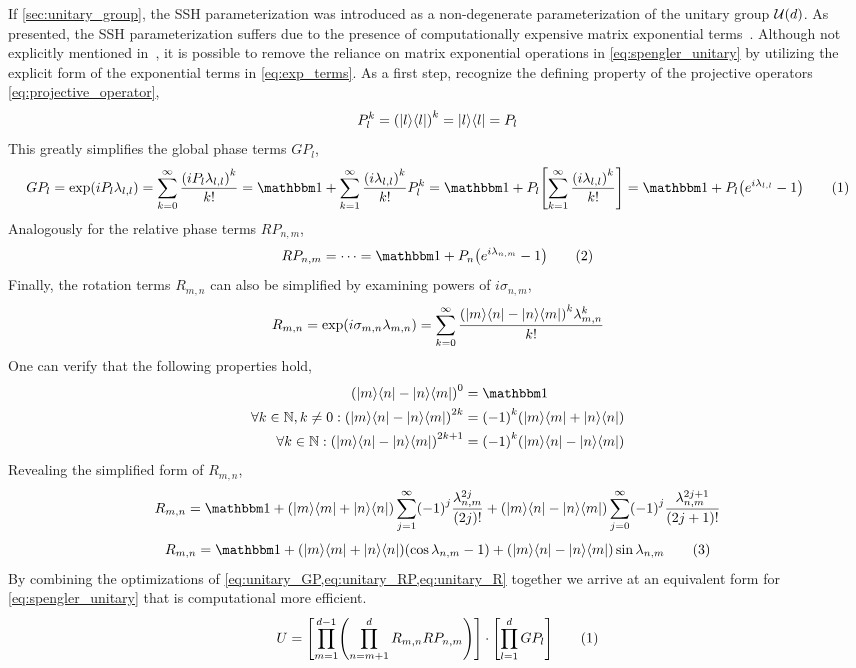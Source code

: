 \documentclass[aps, 10pt, english, twoside, pra, nofootinbib, tightenlines, longbibliography]{revtex4-1}
\begin{document}
    If \cref{sec:unitary_group}, the SSH parameterization was introduced as a non-degenerate parameterization of the unitary group $\s{U}\br{d}$. As presented, the SSH parameterization suffers due to the presence of computationally expensive matrix exponential terms~\cite{Moler_2003}. Although not explicitly mentioned in~\cite{Spengler_2010_Unitary}, it is possible to remove the reliance on matrix exponential operations in \cref{eq:spengler_unitary} by utilizing the explicit form of the exponential terms in \cref{eq:exp_terms}. As a first step, recognize the defining property of the projective operators \cref{eq:projective_operator},
    \[ P_l^k = \br{\ket{l}\bra{l}}^k = \ket{l}\bra{l} = P_l \]
    This greatly simplifies the global phase terms $GP_l$,
    \[ GP_l = \exp\br{iP_l \lambda_{l,l}} = \sum_{k=0}^{\inf} \f{\br{iP_l \lambda_{l,l}}^k}{k!} = \ident + \sum_{k=1}^{\inf} \f{\br{i \lambda_{l,l}}^k}{k!}P_l^k = \ident + P_l \bs{\sum_{k=1}^{\inf} \f{\br{i \lambda_{l,l}}^k}{k!}} = \ident + P_l \br{e^{i \lambda_{l,l}} - 1} \eq \label{eq:unitary_GP} \]
    Analogously for the relative phase terms $RP_{n,m}$,
    \[ RP_{n,m} = \cdots = \ident + P_n \br{e^{i \lambda_{n,m}} - 1} \eq \label{eq:unitary_RP} \]
    Finally, the rotation terms $R_{m,n}$ can also be simplified by examining powers of $i \sigma_{n,m}$,
    \[ R_{m,n} = \exp\br{i \si_{m,n} \lambda_{m,n}} = \sum_{k=0}^{\inf} \f{\br{\ket{m}\bra{n} - \ket{n}\bra{m}}^k \lambda_{m,n}^k}{k!} \]
    One can verify that the following properties hold,
    \begin{align*}
        \br{\ket{m}\bra{n} - \ket{n}\bra{m}}^0 &= \ident \\
        \forall k \in \N, k \neq 0 : \br{\ket{m}\bra{n} - \ket{n}\bra{m}}^{2k} &= \br{-1}^k\br{\ket{m}\bra{m} + \ket{n}\bra{n}} \\
        \forall k \in \N : \br{\ket{m}\bra{n} - \ket{n}\bra{m}}^{2k+1} &= \br{-1}^k\br{\ket{m}\bra{n} - \ket{n}\bra{m}}
    \end{align*}
    Revealing the simplified form of $R_{m,n}$,
    \[ R_{m,n} = \ident + \br{\ket{m}\bra{m} + \ket{n}\bra{n}} \sum_{j=1}^{\inf} \br{-1}^j\f{\lambda_{n,m}^{2j}}{\br{2j}!} + \br{\ket{m}\bra{n} - \ket{n}\bra{m}} \sum_{j=0}^{\inf} \br{-1}^j\f{\lambda_{n,m}^{2j+1}}{\br{2j+1}!} \]
    \[ R_{m,n} = \ident + \br{\ket{m}\bra{m} + \ket{n}\bra{n}} \br{\cos\lambda_{n,m} - 1} + \br{\ket{m}\bra{n} - \ket{n}\bra{m}} \sin\lambda_{n,m} \eq \label{eq:unitary_R} \]
    By combining the optimizations of \cref{eq:unitary_GP,eq:unitary_RP,eq:unitary_R} together we arrive at an equivalent form for \cref{eq:spengler_unitary} that is computational more efficient.
    \[ U = \bs{\prod_{m=1}^{d-1} \br{\prod_{n=m+1}^{d} R_{m,n}RP_{n,m}}} \cdot \bs{\prod_{l=1}^{d} GP_{l}}  \eq \label{eq:spengler_unitary_fast} \]
\end{document}
